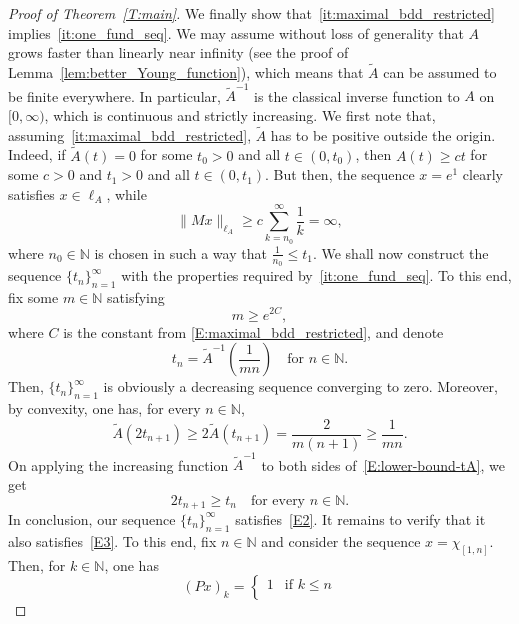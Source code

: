 \documentclass[nointlimits]{amsart}
\numberwithin{equation}{section}
\theoremstyle{plain}
\theoremstyle{definition}
\newcommand{\N}{\mathbb{N}}
\newcommand{\tA}{\tilde{A}}
\begin{document}
\begin{proof}[Proof of Theorem~\ref{T:main}]
We finally show that~\ref{it:maximal_bdd_restricted} implies~\ref{it:one_fund_seq}. We may assume without loss of generality that $A$ grows faster than linearly near infinity (see the proof of Lemma~\ref{lem:better_Young_function}), which means that $\tA$ can be assumed to be finite everywhere. In particular, $\tA^{-1}$ is the classical inverse function to $A$ on $[0, \infty)$, which is continuous and strictly increasing. We first note that, assuming~\ref{it:maximal_bdd_restricted}, $\tA$ has to be positive outside the origin. Indeed, if $\tA(t)=0$ for some $t_0>0$ and all $t\in(0,t_0)$, then $A(t)\ge ct$ for some $c>0$ and $t_1>0$ and all $t\in(0,t_1)$. But then, the sequence $x=e^1$ clearly satisfies $x\in\ell_A$, while
\begin{equation*}
    \|Mx\|_{\ell_A}
    \ge 
    c\sum_{k=n_0}^{\infty}\frac{1}{k}
    =\infty,
\end{equation*}
where $n_0\in\N$ is chosen in such a way that $\frac{1}{n_0}\le t_1$.
We shall now construct the sequence $\{t_n\}_{n=1}^\infty$ with the properties required by~\ref{it:one_fund_seq}. To this end, fix some $m\in\N$ satisfying
\begin{equation}
    \label{E:log-estimate}
   m\ge e^{2C},
\end{equation}
where $C$ is the constant from \eqref{E:maximal_bdd_restricted},
and denote
\begin{equation*}
    t_n
    =\tA^{-1}\left(\frac{1}{mn}\right)
    \quad\text{for $n\in\N$.}
\end{equation*}
Then, $\{t_n\}_{n=1}^\infty$ is obviously a decreasing sequence converging to zero.
Moreover, by convexity, one has, for every $n\in\N$,
\begin{equation}
    \label{E:lower-bound-tA}
   \tA(2t_{n+1})
   \ge 2\tA(t_{n+1})
   =
   \frac{2}{m(n+1)}\ge\frac{1}{mn}.
\end{equation}
On applying the increasing function $\tA^{-1}$ to both sides of~\eqref{E:lower-bound-tA}, we get
\begin{equation*}
   2t_{n+1}
   \ge t_n
   \quad\text{for every $n\in\N$.}
\end{equation*}
In conclusion, our sequence $\{t_n\}_{n=1}^\infty$ satisfies~\eqref{E2}. It remains to verify that it also satisfies~\eqref{E3}. To this end, fix $n\in\N$ and consider the sequence $x=\chi_{[1,n]}$. Then, for $k\in\N$, one has
\begin{equation*}
    (Px)_k=
    \begin{cases}
        1&\text{if $k\le n$}
            \\

\end{cases}
\end{equation*}
\end{proof}
\end{document}
